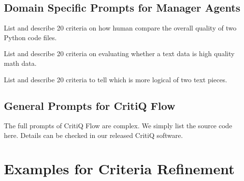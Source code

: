 \subsection{Domain Specific Prompts for Manager Agents}

\begin{tcolorbox}
    [title = {Generate Initial Code Criteria},breakable] \footnotesize List and describe
    20 criteria on how human compare the overall quality of two Python code files.
\end{tcolorbox}

\begin{tcolorbox}
    [title = {Generate Initial Math Criteria},breakable] \footnotesize List and describe
    20 criteria on evaluating whether a text data is high quality math data.
\end{tcolorbox}

\begin{tcolorbox}
    [title = {Generate Initial Logic Criteria},breakable] \footnotesize List and
    describe 20 criteria to tell which is more logical of two text pieces.
\end{tcolorbox}

\subsection{General Prompts for CritiQ Flow}

The full prompts of CritiQ Flow are complex. We simply list the source code here.
Details can be checked in our released CritiQ software.



\section{Examples for Criteria Refinement}
\label{sec:appendix_ex_refinement}

